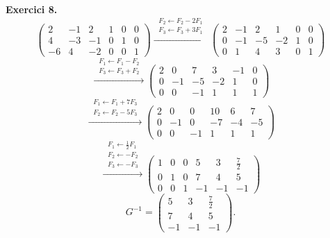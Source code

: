 \documentclass[12pt,a4paper]{article}
\newcommand{\blocInici}{%
  \par\nobreak\vspace{0pt}%
  \begin{minipage}[t]{\linewidth}%
}
\newcommand{\blocFi}{%
  \end{minipage}%
  \par
}
\newcommand{\gaussFletxa}[1]{%
  \mathrel{\xrightarrow{\;\scriptstyle #1\;}}%
}
\begin{document}
\vspace{0.5em}

%
\blocInici
\noindent\textbf{Exercici 8.}
{\setlength{\arraycolsep}{1.8pt}%
\[
  \left(\begin{array}{ccc|ccc}
    2 & -1 & 2 & 1 & 0 & 0 \\
    4 & -3 & -1 & 0 & 1 & 0 \\
    -6 & 4 & -2 & 0 & 0 & 1
  \end{array}\right)
  \gaussFletxa{\substack{F_2 \leftarrow F_2-2F_1\\ F_3 \leftarrow F_3+3F_1}}
  \left(\begin{array}{ccc|ccc}
    2 & -1 & 2 & 1 & 0 & 0 \\
    0 & -1 & -5 & -2 & 1 & 0 \\
    0 & 1 & 4 & 3 & 0 & 1
  \end{array}\right)
\]
\[
  \gaussFletxa{\substack{F_1 \leftarrow F_1-F_2\\ F_3 \leftarrow F_3+F_2}}
  \left(\begin{array}{ccc|ccc}
    2 & 0 & 7 & 3 & -1 & 0 \\
    0 & -1 & -5 & -2 & 1 & 0 \\
    0 & 0 & -1 & 1 & 1 & 1
  \end{array}\right)
\]
\[
  \gaussFletxa{\substack{F_1 \leftarrow F_1+7F_3\\ F_2 \leftarrow F_2-5F_3}}
  \left(\begin{array}{ccc|ccc}
    2 & 0 & 0 & 10 & 6 & 7 \\
    0 & -1 & 0 & -7 & -4 & -5 \\
    0 & 0 & -1 & 1 & 1 & 1
  \end{array}\right)
\]
\[
  \gaussFletxa{\substack{F_1 \leftarrow \tfrac{1}{2}F_1\\ F_2 \leftarrow -F_2\\ F_3 \leftarrow -F_3}}
  \left(\begin{array}{ccc|ccc}
    1 & 0 & 0 & 5 & 3 & \tfrac{7}{2} \\
    0 & 1 & 0 & 7 & 4 & 5 \\
    0 & 0 & 1 & -1 & -1 & -1
  \end{array}\right)
\]
}
\[
  G^{-1} =
  \begin{pmatrix}
    5 & 3 & \tfrac{7}{2} \\
    7 & 4 & 5 \\
    -1 & -1 & -1
  \end{pmatrix}.
\]
\blocFi
\end{document}
